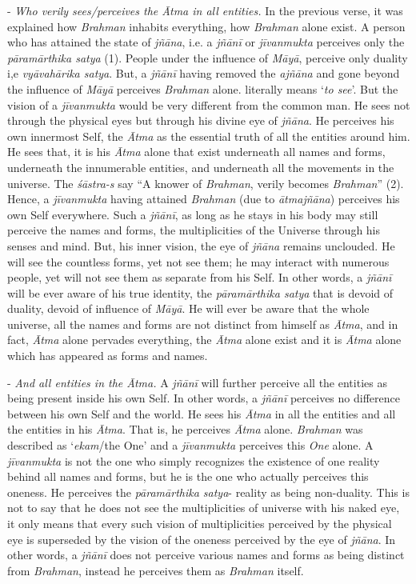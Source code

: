 - \emph{Who verily sees/perceives the Ātma in all entities.} In the previous verse, it was explained how \emph{Brahman} inhabits everything, how \emph{Brahman} alone exist. A person who has attained the state of \emph{jñāna}, i.e. a \emph{jñānī} or \emph{jīvanmukta} perceives only the \emph{pāramārthika satya} (1). People under the influence of \emph{Māyā}, perceive only duality i,e \emph{vyāvahārika satya}. But, a \emph{jñānī} having removed the \emph{ajñāna} and gone beyond the influence of \emph{Māyā} perceives \emph{Brahman} alone.  literally means `\emph{to see}'. But the vision of a \emph{jīvanmukta} would be very different from the common man. He sees not through the physical eyes but through his divine eye of \emph{jñāna}. He perceives his own innermost Self, the \emph{Ātma} as the essential truth of all the entities around him. He sees that, it is his \emph{Ātma} alone that exist underneath all names and forms, underneath the innumerable entities, and underneath all the movements in the universe. The \emph{śāstra-s} say ``A knower of \emph{Brahman}, verily becomes \emph{Brahman}'' (2). Hence, a \emph{jīvanmukta} having attained \emph{Brahman} (due to \emph{ātmajñāna}) perceives his own Self everywhere. Such a \emph{jñānī}, as long as he stays in his body may still perceive the names and forms, the multiplicities of the Universe through his senses and mind. But, his inner vision, the eye of \emph{jñāna} remains unclouded. He will see the countless forms, yet not see them; he may interact with numerous people, yet will not see them as separate from his Self. In other words, a \emph{jñānī} will be ever aware of his true identity, the \emph{pāramārthika satya} that is devoid of duality, devoid of influence of \emph{Māyā}. He will ever be aware that the whole universe, all the names and forms are not distinct from himself as \emph{Ātma}, and in fact, \emph{Ātma} alone pervades everything, the \emph{Ātma} alone exist and it is \emph{Ātma} alone which has appeared as forms and names.

- \emph{And all entities in the Ātma.} A \emph{jñānī} will further perceive all the entities as being present inside his own Self. In other words, a \emph{jñānī} perceives no difference between his own Self and the world. He sees his \emph{Ātma} in all the entities and all the entities in his \emph{Ātma}. That is, he perceives \emph{Ātma} alone. \emph{Brahman} was described as `\emph{ekam}/the One' and a \emph{jīvanmukta} perceives this \emph{One} alone. A \emph{jīvanmukta} is not the one who simply recognizes the existence of one reality behind all names and forms, but he is the one who actually perceives this oneness. He perceives the \emph{pāramārthika satya}- reality as being non-duality. This is not to say that he does not see the multiplicities of universe with his naked eye, it only means that every such vision of multiplicities perceived by the physical eye is superseded by the vision of the oneness perceived by the eye of \emph{jñāna}. In other words, a \emph{jñānī} does not perceive various names and forms as being distinct from \emph{Brahman}, instead he perceives them as \emph{Brahman} itself.

